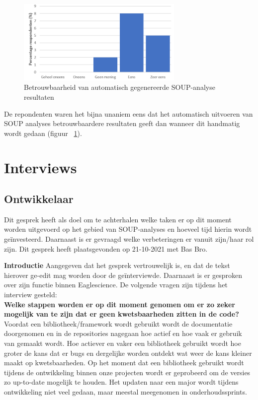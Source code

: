 \begin{figure}[bth]
    \centering
    \includegraphics[width=8cm]{gfx/appendix/Vraag5}
    \caption{Betrouwbaarheid van automatisch gegenereerde SOUP-analyse resultaten }
    \label{fig:EnqueteV5}
\end{figure}

De repondenten waren het bijna unaniem eens dat het automatisch uitvoeren van SOUP analyses betrouwbaardere resultaten geeft dan wanneer dit handmatig wordt gedaan (figuur ~\ref{fig:EnqueteV5}).

\clearpage
\section{Interviews}\label{sec:interviews}

\subsection{Ontwikkelaar}\label{subsec:ontwikkelaar}
Dit gesprek heeft als doel om te achterhalen welke taken er op dit moment worden uitgevoerd op het gebied van SOUP-analyses en hoeveel tijd hierin wordt geïnvesteerd. Daarnaast is er gevraagd welke verbeteringen er vanuit zijn/haar rol zijn. Dit gesprek heeft plaatsgevonden op 21-10-2021 met Bas Bro.\smallskip

\textbf{Introductie }
Aangegeven dat het gesprek vertrouwelijk is, en dat de tekst hierover ge-edit mag worden door de geïnterviewde.
Daarnaast is er gesproken over zijn functie binnen Eaglescience.
De volgende vragen zijn tijdens het interview gesteld:
\\
\textbf{Welke stappen worden er op dit moment genomen om er zo zeker mogelijk van te zijn dat er geen kwetsbaarheden zitten in de code? }
Voordat een bibliotheek/framework wordt gebruikt wordt de documentatie doorgenomen en in de repositories nagegaan hoe actief en hoe vaak er gebruik van gemaakt wordt. Hoe actiever en vaker een bibliotheek gebruikt wordt hoe groter de kans dat er bugs en dergelijke worden ontdekt wat weer de kans kleiner maakt op kwetsbaarheden. Op het moment dat een bibliotheek gebruikt wordt tijdens de ontwikkeling binnen onze projecten wordt er geprobeerd om de versies zo up-to-date mogelijk te houden. Het updaten naar een major wordt tijdens ontwikkeling niet veel gedaan, maar meestal meegenomen in onderhoudssprints.

